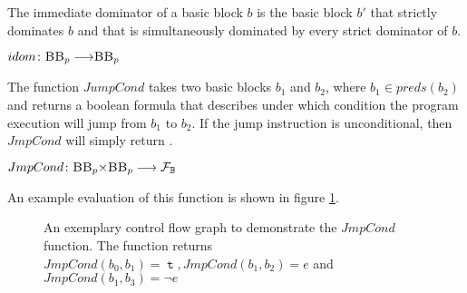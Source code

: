\begin{definition} The immediate dominator of a basic block $b$ is the basic block $b'$ that strictly dominates $b$ and that is simultaneously dominated by every strict dominator of $b$.
    \begin{center}
        $idom\colon \mbb_p \longrightarrow \mbb_p$
    \end{center}
\end{definition}

\begin{definition} The function $JumpCond$ takes two basic blocks $b_1$ and $b_2$, where $b_1 \in preds(b_2)$ and returns a boolean formula that describes under which condition the program execution will jump from $b_1$ to $b_2$. If the jump instruction is unconditional, then $JmpCond$ will simply return \ttt.
    \begin{center}
        $JmpCond\colon \mbb_p \times \mbb_p \longrightarrow \mbform$
    \end{center}
\end{definition}
An example evaluation of this function is shown in figure \ref{fig:jmp_cond}.

\begin{figure}[H]
    \label{fig:jmp_cond}
    \centering
    \caption{An exemplary control flow graph to demonstrate the $JmpCond$ function. The function returns $JmpCond(b_0, b_1) = \mttt, JmpCond(b_1, b_2) = e$ and $JmpCond(b_1, b_3) = \neg e$}
\end{figure}
    
